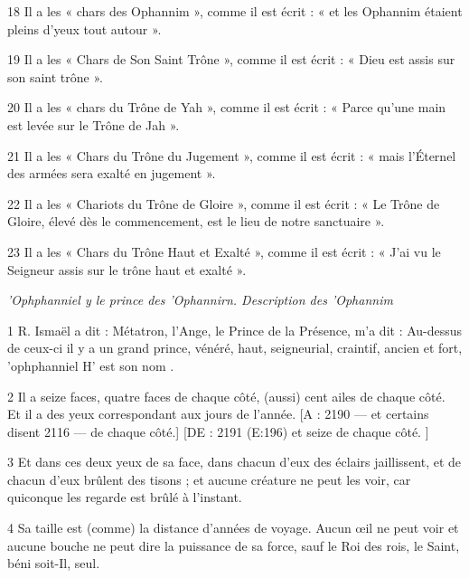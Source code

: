 \par 18 Il a les « chars des Ophannim », comme il est écrit : « et les Ophannim étaient pleins d'yeux tout autour ».

\par 19 Il a les « Chars de Son Saint Trône », comme il est écrit : « Dieu est assis sur son saint trône ».

\par 20 Il a les « chars du Trône de Yah », comme il est écrit : « Parce qu'une main est levée sur le Trône de Jah ».

\par 21 Il a les « Chars du Trône du Jugement », comme il est écrit : « mais l'Éternel des armées sera exalté en jugement ».

\par 22 Il a les « Chariots du Trône de Gloire », comme il est écrit : « Le Trône de Gloire, élevé dès le commencement, est le lieu de notre sanctuaire ».

\par 23 Il a les « Chars du Trône Haut et Exalté », comme il est écrit : « J'ai vu le Seigneur assis sur le trône haut et exalté ».


\par \textit{'Ophphanniel y le prince des 'Ophannirn. Description des 'Ophannim}

\par 1 R. Ismaël a dit : Métatron, l'Ange, le Prince de la Présence, m'a dit : Au-dessus de ceux-ci il y a un grand prince, vénéré, haut, seigneurial, craintif, ancien et fort, 'ophphanniel H' est son nom .

\par 2 Il a seize faces, quatre faces de chaque côté, (aussi) cent ailes de chaque côté. Et il a des yeux correspondant aux jours de l'année. [A : 2190 — et certains disent 2116 — de chaque côté.] [DE : 2191 (E:196) et seize de chaque côté. ]

\par 3 Et dans ces deux yeux de sa face, dans chacun d'eux des éclairs jaillissent, et de chacun d'eux brûlent des tisons ; et aucune créature ne peut les voir, car quiconque les regarde est brûlé à l'instant.

\par 4 Sa taille est (comme) la distance d'années de voyage. Aucun œil ne peut voir et aucune bouche ne peut dire la puissance de sa force, sauf le Roi des rois, le Saint, béni soit-Il, seul.

